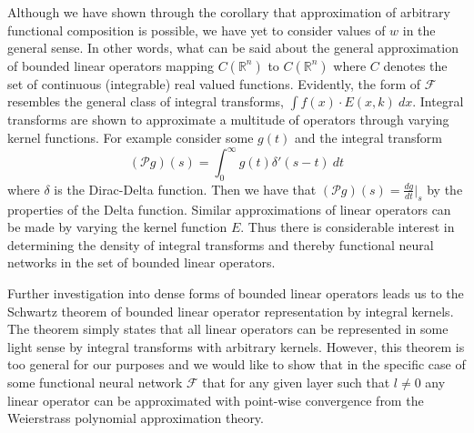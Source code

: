 \documentclass{ib-assignment}
\begin{document}
Although we have shown through the corollary that approximation of arbitrary functional composition is possible, we have yet to consider values of $w$ in the general sense. In other words, what can be said about the general approximation of bounded linear operators mapping  $C(\mathbb{R}^n)$ to $C(\mathbb{R}^n)$ where $C$ denotes the set of continuous (integrable) real valued functions. Evidently, the form of $\mathcal{F}$ resembles the general class of integral transforms, $\int f(x)\cdot E(x,k)\ dx$. Integral transforms are shown to approximate a multitude of operators through varying kernel functions. For example consider some $g(t)$ and the integral transform
$$(\mathcal{P}g)(s) = \int_0^\infty g(t)\delta'(s-t)\ dt$$
where $\delta$ is the Dirac-Delta function. Then we have that $(\mathcal{P}g)(s) = \frac{dg}{dt}\Big|_s$ by the properties of the Delta function. Similar approximations of linear operators can be made by varying the kernel function $E$. Thus there is considerable interest in determining the density of integral transforms and thereby functional neural networks in the set of bounded linear operators.


Further investigation into dense forms of bounded linear operators leads us to the Schwartz theorem of bounded linear operator representation by integral kernels. The theorem simply states that all linear operators can be represented in some light sense by integral transforms with arbitrary kernels. However, this theorem is too general for our purposes and we would like to show that in the specific case of some functional neural network $\mathcal{F}$ that for any given layer such that $l\neq 0$ any linear operator can be approximated with point-wise convergence from the Weierstrass polynomial approximation theory.
\end{document}
